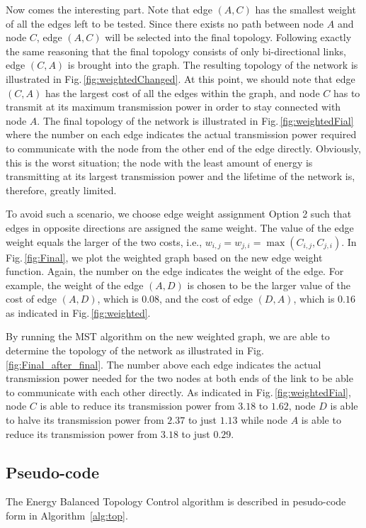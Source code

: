 \documentclass[journal,12pt,onecolumn]{IEEEtran}
\begin{document}
Now comes the interesting part. Note that edge $(A,C)$ has the
smallest weight of all the edges left to be tested. Since there
exists no path between node $A$ and node $C$, edge $(A,C)$ will be
selected into the final topology. Following exactly the same reasoning
that the final topology consists of only bi-directional links, edge
$(C,A)$ is brought into the graph. The resulting topology of the
network is illustrated in Fig.\,\ref{fig:weightedChanged}. At this
point, we should note that edge $(C,A)$ has the largest cost of all
the edges within the graph, and node $C$ has to transmit at its
maximum transmission power in order to stay connected with node $A$.
The final topology of the network is illustrated in
Fig.\,\ref{fig:weightedFial} where the number on each edge indicates
the actual transmission power required to communicate with the node
from the other end of the edge directly. Obviously, this is the
worst situation; the node with the least amount of energy is
transmitting at its largest transmission power and the lifetime of
the network is, therefore, greatly limited.

To avoid such a scenario, we choose edge weight assignment Option 2
such that edges in opposite directions are assigned the same
weight. The value of the edge weight equals the larger of the two
costs, i.e., $w_{i,j}=w_{j,i}=\max(C_{i,j},C_{j,i})$. In
Fig.\,\ref{fig:Final}, we plot the weighted graph based on the new
edge weight function. Again, the number on the edge indicates the
weight of the edge. For example, the weight of the edge $(A,D)$ is
chosen to be the larger value of the cost of edge $(A,D)$, which is
$0.08$, and the cost of edge $(D,A)$, which is $0.16$ as indicated in
Fig.\,\ref{fig:weighted}.

By running the MST algorithm on the new weighted graph, we are able to
determine the topology of the network as illustrated in
Fig.\,\ref{fig:Final_after_final}. The number above each edge
indicates the actual transmission power needed for the two nodes at
both ends of the link to be able to communicate with each other
directly. As indicated in Fig.\,\ref{fig:weightedFial}, node $C$ is
able to reduce its transmission power from $3.18$ to
$1.62$, node $D$ is able to halve its transmission power from $2.37$
to just $1.13$ while node $A$ is able to reduce its transmission power
from $3.18$ to just $0.29$.





\subsection{Pseudo-code}
The Energy Balanced Topology Control algorithm is described in
pesudo-code form in Algorithm \,\ref{alg:top}.
\end{document}
